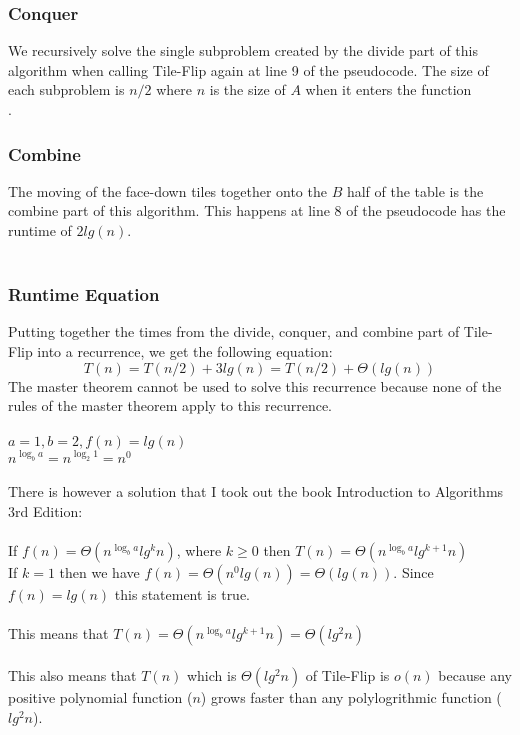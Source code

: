 \documentclass[12pt]{article}
\begin{document}
\subsubsection*{Conquer}
We recursively solve the single subproblem created by the divide part of this algorithm when calling Tile-Flip again at line 9 of the pseudocode.  The size of each subproblem is $n/2$ where $n$ is the size of $A$ when it enters the function\\.   
\subsubsection*{Combine}
The moving of the face-down tiles together onto the $B$ half of the table is the combine part of this algorithm.  This happens at line 8 of the pseudocode has the runtime of $2lg(n)$.\\
\\
\subsubsection*{Runtime Equation}
\noindent
Putting together the times from the divide, conquer, and combine part of Tile-Flip into a recurrence, we get the following equation:
$$
T(n) = T(n/2) + 3lg(n) = T(n/2) + \Theta{(lg(n))}
$$
The master theorem cannot be used to solve this recurrence because none of the rules of the master theorem apply to this recurrence.\\
\\
$a=1, b=2, f(n) = lg(n)$\\
$n^{\log_{b} a} = n^{\log_{2} 1} = n^0$\\
\\
There is however a solution that I took out the book Introduction to Algorithms 3rd Edition:\\
\\
If $f(n) = \Theta{(n^{\log_{b} a}lg^k n)}$, where $k \ge 0$ then $T(n) = \Theta{(n^{\log_{b} a}lg^{k+1} n)}$\\
If $k=1$ then we have $f(n) = \Theta{(n^0lg(n))} = \Theta{(lg(n))}$.  Since $f(n) = lg(n)$ this statement is true.\\
\\
This means that $T(n) = \Theta{(n^{\log_{b} a}lg^{k+1} n)} = \Theta{(lg^{2} n)}$\\
\\
This also means that $T(n)$ which is $ \Theta{(lg^{2} n)}$ of Tile-Flip is $o(n)$ because any positive polynomial function ($n$) grows faster than any polylogrithmic function ($lg^2 n$).
\end{document}

